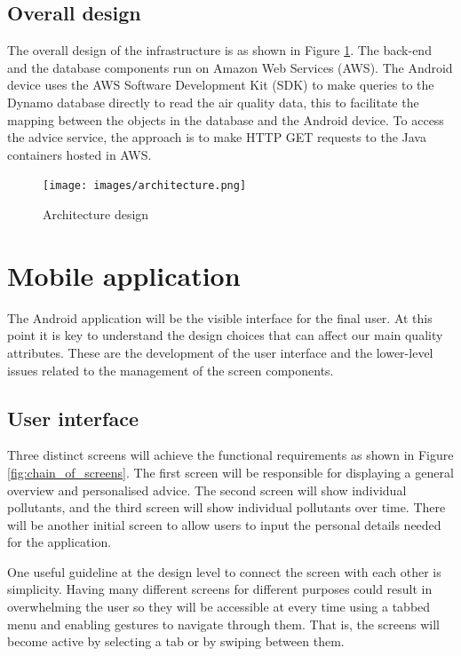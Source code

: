 \subsection{Overall design}
The overall design of the infrastructure is as shown in Figure \ref{fig:architecture}. The back-end and the database components run on Amazon Web Services (AWS). The Android device uses the AWS Software Development Kit (SDK) to make queries to the Dynamo database directly to read the air quality data, this to facilitate the mapping between the objects in the database and the Android device. To access the advice service, the approach is to make HTTP GET requests to the Java containers hosted in AWS. 
\begin{figure}[H]
\begin{adjustbox}{width=.65\textwidth,center=\textwidth}
  \centering
  \texttt{[image: images/architecture.png]}
\end{adjustbox}
  \caption[Architecture design]{Architecture design}
  \label{fig:architecture}
\end{figure}

\section{Mobile application}
The Android application will be the visible interface for the final user. At this point it is key to understand the design choices that can affect our main quality attributes. These are the development of the user interface and the lower-level issues related to the management of the screen components.

\subsection{User interface}
Three distinct screens will achieve the functional requirements as shown in Figure \ref{fig:chain_of_screens}. The first screen will be responsible for displaying a general overview and personalised advice. The second screen will show individual pollutants, and the third screen will show individual pollutants over time. There will be another initial screen to allow users to input the personal details needed for the application.

One useful guideline at the design level to connect the screen with each other is simplicity. Having many different screens for different purposes could result in overwhelming the user so they will be accessible at every time using a tabbed menu and enabling gestures to navigate through them. That is, the screens will become active by selecting a tab or by swiping between them.

